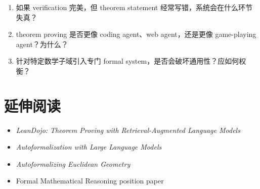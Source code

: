 \documentclass[a4paper]{article}
\begin{document}
\begin{enumerate}
\item 如果 verification 完美，但 theorem statement 经常写错，系统会在什么环节失真？
\item theorem proving 是否更像 coding agent、web agent，还是更像 game-playing agent？为什么？
\item 针对特定数学子域引入专门 formal system，是否会破坏通用性？应如何权衡？
\end{enumerate}

\section{延伸阅读}

\begin{itemize}
\item \emph{LeanDojo: Theorem Proving with Retrieval-Augmented Language Models}
\item \emph{Autoformalization with Large Language Models}
\item \emph{Autoformalizing Euclidean Geometry}
\item Formal Mathematical Reasoning position paper
\end{itemize}
\end{document}

